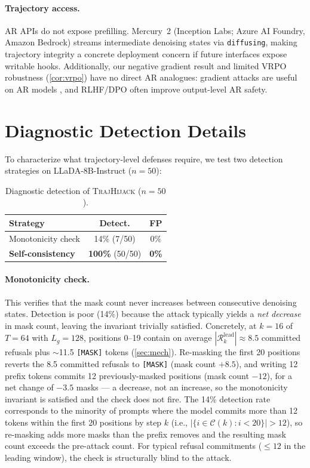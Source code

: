 \documentclass{article}
\theoremstyle{coloredthm}
\newcommand{\method}{\textsc{TrajHijack}}
\newcommand{\maskid}{\texttt{[MASK]}}
\begin{document}
\paragraph{Trajectory access.} AR APIs do not expose prefilling. Mercury~2 \citep{mercury2026} (Inception Labs; Azure AI Foundry, Amazon Bedrock) streams intermediate denoising states via \texttt{diffusing}, making trajectory integrity a concrete deployment concern if future interfaces expose writable hooks. Additionally, our negative gradient result and limited VRPO robustness (\cref{cor:vrpo}) have no direct AR analogues: gradient attacks are useful on AR models \citep{zou2023gcg}, and RLHF/DPO often improve output-level AR safety.

\section{Diagnostic Detection Details}
\label{sec:detection_appendix}

To characterize what trajectory-level defenses require, we test two detection strategies on LLaDA-8B-Instruct ($n{=}50$):

\begin{table}[H]
\centering
\small
\begin{tabular}{@{}lcc@{}}
\toprule
\textbf{Strategy} & \textbf{Detect.} & \textbf{FP} \\
\midrule
\rowcolor{cellpink} Monotonicity check & 14\% (7/50) & 0\% \\
\rowcolor{celltealg} \textbf{Self-consistency} & \textbf{100\%} (50/50) & \textbf{0\%} \\
\bottomrule
\end{tabular}
\caption{Diagnostic detection of \method{} ($n{=}50$).}
\label{tab:detection}
\end{table}

\paragraph{Monotonicity check.} This verifies that the mask count never increases between consecutive denoising states. Detection is poor (14\%) because the attack typically yields a \emph{net decrease} in mask count, leaving the invariant trivially satisfied. Concretely, at $k{=}16$ of $T{=}64$ with $L_g{=}128$, positions 0--19 contain on average $|\mathcal{R}^{\text{lead}}_k| \approx 8.5$ committed refusals plus $\sim$11.5 \maskid{} tokens (\cref{sec:mech}). Re-masking the first 20 positions reverts the 8.5 committed refusals to \maskid{} (mask count $+8.5$), and writing 12 prefix tokens commits 12 previously-masked positions (mask count $-12$), for a net change of $-3.5$ masks --- a decrease, not an increase, so the monotonicity invariant is satisfied and the check does not fire. The 14\% detection rate corresponds to the minority of prompts where the model commits more than 12 tokens within the first 20 positions by step $k$ (i.e., $|\{i \in \mathcal{C}(k) : i < 20\}| > 12$), so re-masking adds more masks than the prefix removes and the resulting mask count exceeds the pre-attack count. For typical refusal commitments ($\leq 12$ in the leading window), the check is structurally blind to the attack.
\end{document}
